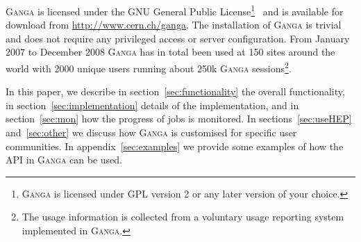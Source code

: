 \documentclass{elsart}
\def\ganga {\textsc{Ganga}\xspace}
\begin{document}
\ganga is licensed under the GNU General Public
License\footnote{\ganga is licensed under GPL version 2 or any later version
  of your choice.}~\cite{GPL} and is available for download from
\url{http://www.cern.ch/ganga}. The installation of \ganga is trivial and
does not require any privileged access or server configuration. 
From January 2007 to December 2008 \ganga has in total been
used at 150 sites around the world with 2000 unique users running about 250k %
\ganga sessions\footnote{The usage information is collected from a voluntary
  usage reporting system implemented in \ganga.}.

In this paper, we describe in section~\ref{sec:functionality} the overall
functionality, in section~\ref{sec:implementation} details of the
implementation, and in section~\ref{sec:mon} how the progress of jobs is
monitored. In sections~\ref{sec:useHEP} and~\ref{sec:other} we discuss how
\ganga is customised for specific user communities. In
appendix~\ref{sec:examples} we provide some examples of how the API in \ganga
can be used.
\end{document}
